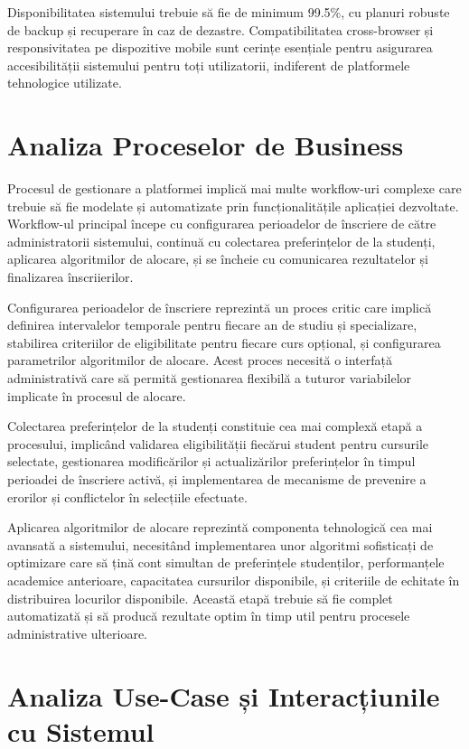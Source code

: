 \documentclass[12pt,a4paper]{report}
\begin{document}
Disponibilitatea sistemului trebuie să fie de minimum 99.5\%, cu planuri robuste de backup și recuperare în caz de dezastre. Compatibilitatea cross-browser și responsivitatea pe dispozitive mobile sunt cerințe esențiale pentru asigurarea accesibilității sistemului pentru toți utilizatorii, indiferent de platformele tehnologice utilizate.

\section{Analiza Proceselor de Business}

Procesul de gestionare a platformei implică mai multe workflow-uri complexe care trebuie să fie modelate și automatizate prin funcționalitățile aplicației dezvoltate. Workflow-ul principal începe cu configurarea perioadelor de înscriere de către administratorii sistemului, continuă cu colectarea preferințelor de la studenți, aplicarea algoritmilor de alocare, și se încheie cu comunicarea rezultatelor și finalizarea înscriierilor.

Configurarea perioadelor de înscriere reprezintă un proces critic care implică definirea intervalelor temporale pentru fiecare an de studiu și specializare, stabilirea criteriilor de eligibilitate pentru fiecare curs opțional, și configurarea parametrilor algoritmilor de alocare. Acest proces necesită o interfață administrativă care să permită gestionarea flexibilă a tuturor variabilelor implicate în procesul de alocare.

Colectarea preferințelor de la studenți constituie cea mai complexă etapă a procesului, implicând validarea eligibilității fiecărui student pentru cursurile selectate, gestionarea modificărilor și actualizărilor preferințelor în timpul perioadei de înscriere activă, și implementarea de mecanisme de prevenire a erorilor și conflictelor în selecțiile efectuate.

Aplicarea algoritmilor de alocare reprezintă componenta tehnologică cea mai avansată a sistemului, necesitând implementarea unor algoritmi sofisticați de optimizare care să țină cont simultan de preferințele studenților, performanțele academice anterioare, capacitatea cursurilor disponibile, și criteriile de echitate în distribuirea locurilor disponibile. Această etapă trebuie să fie complet automatizată și să producă rezultate optim în timp util pentru procesele administrative ulterioare.

\section{Analiza Use-Case și Interacțiunile cu Sistemul}
\end{document}
